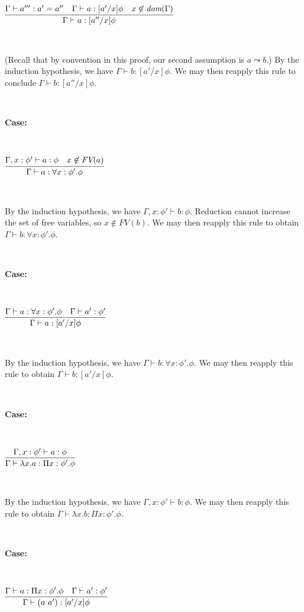 \documentclass[copyright]{eptcs}
\begin{document}
\

$\infer{\Gamma\vdash a:[a''/x]\phi}{\Gamma \vdash a''': a' = a'' & \Gamma \vdash a:[a'/x]\phi & x\not\in\textit{dom}(\Gamma)}$

\ 

\noindent (Recall that by convention in this proof, our second
assumption is $a\leadsto b$.)  By the induction hypothesis, we have
$\Gamma \vdash b:[a'/x]\phi$.  We may then reapply this rule to
conclude $\Gamma\vdash b:[a''/x]\phi$.

\ 

\noindent \textbf{Case:}

\

$\infer{\Gamma \vdash a : \forall x:\phi'.\phi}{\Gamma, x:\phi' \vdash a:\phi & x\not\in\textit{FV}(a)}$

\ 

\noindent By the induction hypothesis, we have $\Gamma, x:\phi' \vdash
b:\phi$.  Reduction cannot increase the set of free variables, so
$x\not\in\textit{FV}(b)$.  We may then reapply this rule to obtain
$\Gamma\vdash b:\forall x:\phi'.\phi$.

\ 

\noindent \textbf{Case:}

\

$\infer{\Gamma \vdash a : [a'/x]\phi}{\Gamma \vdash a:\forall x:\phi'.\phi & \Gamma \vdash a':\phi'}$

\ 

\noindent By the induction hypothesis, we have $\Gamma \vdash
b:\forall x:\phi'.\phi$.  We may then reapply this rule to obtain
$\Gamma \vdash b:[a'/x]\phi$.

\ 

\noindent \textbf{Case:}

\

$\infer{\Gamma \vdash \lambda x.a : \Pi x:\phi'.\phi}
      {\Gamma, x:\phi' \vdash a:\phi}$

\ 

\noindent By the induction hypothesis, we have $\Gamma, x:\phi' \vdash
b:\phi$.  We may then reapply this rule to obtain $\Gamma \vdash
\lambda x.b : \Pi x:\phi'.\phi$.

\ 

\noindent \textbf{Case:}

\

$\infer{\Gamma \vdash (a\ a') : [a'/x]\phi}{\Gamma \vdash a:\Pi x:\phi'.\phi & \Gamma\vdash a':\phi'}$

\ 
\end{document}
